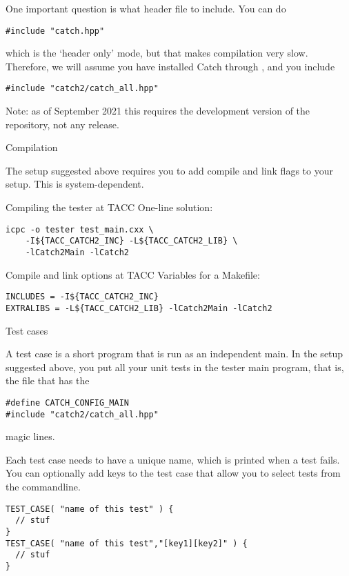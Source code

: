 One important question is what header file to include.
You can do 
\begin{lstlisting}
#include "catch.hpp"
\end{lstlisting}
which is the `header only' mode,
but that makes compilation very slow.
Therefore, we will assume you have installed Catch through ,
and you include
\begin{lstlisting}
#include "catch2/catch_all.hpp"
\end{lstlisting}
Note: as of September 2021 this requires the development version of the repository,
not any  release.

 {Compilation}

The setup suggested above requires you to add compile and link flags to your setup.
This is system-dependent.

\begin{tacc}
\begin{block}{Compiling the tester at TACC}
\label{sl:catch-compile}
One-line solution:
\begin{verbatim}
icpc -o tester test_main.cxx \
    -I${TACC_CATCH2_INC} -L${TACC_CATCH2_LIB} \
    -lCatch2Main -lCatch2
\end{verbatim}
\end{block}
\begin{block}{Compile and link options at TACC}
\label{sl:catch-compile-options}
Variables for a Makefile:
\begin{verbatim}
INCLUDES = -I${TACC_CATCH2_INC}
EXTRALIBS = -L${TACC_CATCH2_LIB} -lCatch2Main -lCatch2
\end{verbatim}
\end{block}
\end{tacc}

 {Test cases}

A test case is a short program that is run as an independent main.
In the setup suggested above, you put all your unit tests
in the tester main program, that is,
the file that has the
\begin{lstlisting}
#define CATCH_CONFIG_MAIN
#include "catch2/catch_all.hpp"
\end{lstlisting}
magic lines.

Each test case needs to have a unique name,
which is printed when a test fails.
You can optionally add keys to the test case
that allow you to select tests from the commandline.

\begin{lstlisting}
TEST_CASE( "name of this test" ) {
  // stuf
}
TEST_CASE( "name of this test","[key1][key2]" ) {
  // stuf
}
\end{lstlisting}

